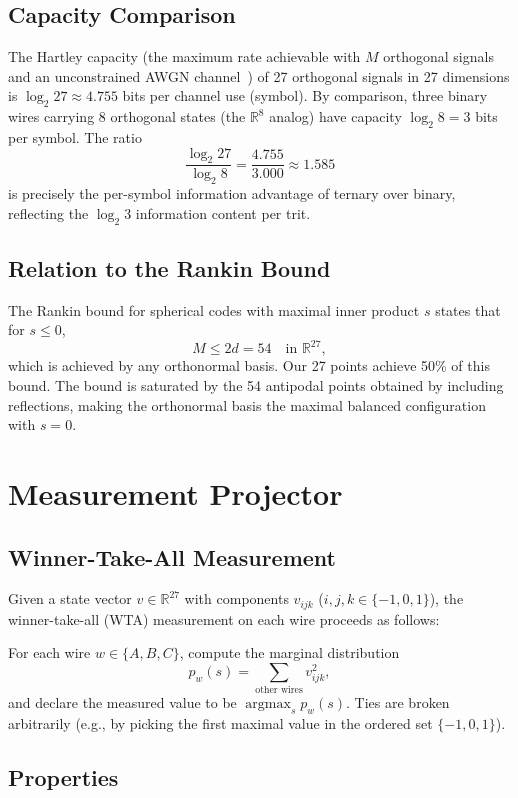 \documentclass[12pt,a4paper]{article}
\begin{document}
\subsection{Capacity Comparison}

The Hartley capacity (the maximum rate achievable with $M$ orthogonal
signals and an unconstrained AWGN channel~\cite{knuth1981positional})
of 27 orthogonal signals in 27 dimensions is $\log_2 27 \approx 4.755$
bits per channel use (symbol). By comparison, three binary wires
carrying 8 orthogonal states (the $\mathbb{R}^8$ analog) have capacity
$\log_2 8 = 3$ bits per symbol. The ratio
\[
\frac{\log_2 27}{\log_2 8} = \frac{4.755}{3.000} \approx 1.585
\]
is precisely the per-symbol information advantage of ternary over binary,
reflecting the $\log_2 3$ information content per trit.

\subsection{Relation to the Rankin Bound}

The Rankin bound for spherical codes with maximal inner product $s$ states
that for $s \le 0$,
\[
M \le 2d = 54\quad\text{in }\mathbb{R}^{27},
\]
which is achieved by any orthonormal basis. Our 27 points achieve 50\% of
this bound. The bound is saturated by the 54 antipodal points obtained by
including reflections, making the orthonormal basis the maximal balanced
configuration with $s = 0$.

\section{Measurement Projector}

\subsection{Winner-Take-All Measurement}

Given a state vector $v \in \mathbb{R}^{27}$ with components $v_{ijk}$
($i,j,k \in \{-1,0,1\}$), the winner-take-all (WTA) measurement on each
wire proceeds as follows:

For each wire $w \in \{A,B,C\}$, compute the marginal distribution
\[
p_w(s) = \sum_{\text{other wires}} v_{ijk}^2,
\]
and declare the measured value to be $\operatorname{argmax}_s p_w(s)$.
Ties are broken arbitrarily (e.g., by picking the first maximal value
in the ordered set $\{-1,0,1\}$).

\subsection{Properties}
\end{document}
